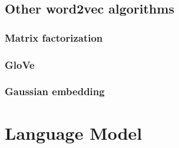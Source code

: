 \documentclass{report}
\begin{document}
\section{Other word2vec algorithms}
\subsection{Matrix factorization}
\subsection{GloVe}
\subsection{Gaussian embedding}

\chapter{Language Model}
\end{document}
